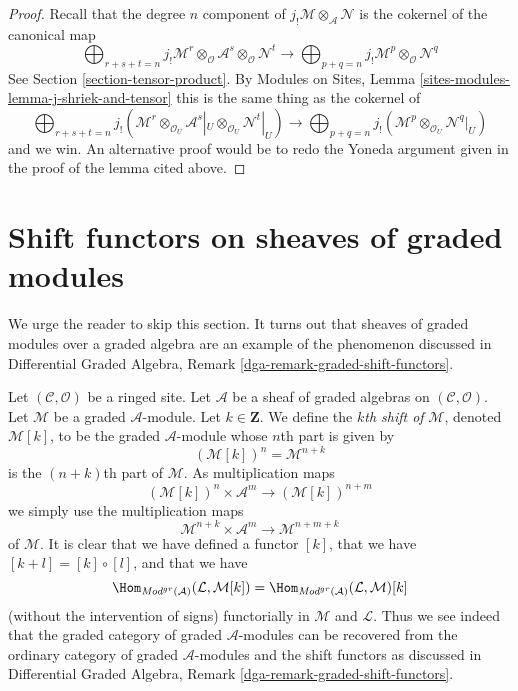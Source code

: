 \begin{proof}
Recall that the degree $n$ component of
$j_!\mathcal{M} \otimes_\mathcal{A} \mathcal{N}$ is the cokernel of
the canonical map
$$
\bigoplus\nolimits_{r + s + t = n}
j_!\mathcal{M}^r \otimes_\mathcal{O}
\mathcal{A}^s \otimes_\mathcal{O}
\mathcal{N}^t
\longrightarrow
\bigoplus\nolimits_{p + q = n}
j_!\mathcal{M}^p \otimes_\mathcal{O} \mathcal{N}^q
$$
See Section \ref{section-tensor-product}.
By Modules on Sites, Lemma \ref{sites-modules-lemma-j-shriek-and-tensor}
this is the same thing as the cokernel of
$$
\bigoplus\nolimits_{r + s + t = n}
j_!(\mathcal{M}^r \otimes_{\mathcal{O}_U}
\mathcal{A}^s|_U \otimes_{\mathcal{O}_U}
\mathcal{N}^t|_U)
\longrightarrow
\bigoplus\nolimits_{p + q = n}
j_!(\mathcal{M}^p \otimes_{\mathcal{O}_U} \mathcal{N}^q|_U)
$$
and we win. An alternative proof would be to redo the Yoneda
argument given in the proof of the lemma cited above.
\end{proof}








\section{Shift functors on sheaves of graded modules}
\label{section-shift}

\noindent
We urge the reader to skip this section. It turns out that sheaves
of graded modules over a graded algebra are an example of the phenomenon
discussed in
Differential Graded Algebra, Remark \ref{dga-remark-graded-shift-functors}.

\medskip\noindent
Let $(\mathcal{C}, \mathcal{O})$ be a ringed site.
Let $\mathcal{A}$ be a sheaf of graded algebras
on $(\mathcal{C}, \mathcal{O})$.
Let $\mathcal{M}$ be a graded $\mathcal{A}$-module. Let $k \in \mathbf{Z}$.
We define the {\it $k$th shift of} $\mathcal{M}$, denoted $\mathcal{M}[k]$,
to be the graded $\mathcal{A}$-module whose $n$th part is given by
$$
(\mathcal{M}[k])^n = \mathcal{M}^{n + k}
$$
is the $(n + k)$th part of $\mathcal{M}$. As multiplication maps
$$
(\mathcal{M}[k])^n \times \mathcal{A}^m
\longrightarrow
(\mathcal{M}[k])^{n + m}
$$
we simply use the multiplication maps
$$
\mathcal{M}^{n + k} \times \mathcal{A}^m
\longrightarrow
\mathcal{M}^{n + m + k}
$$
of $\mathcal{M}$. It is clear that we have defined a functor $[k]$,
that we have $[k + l] = [k] \circ [l]$, and that we have
$$
\Hom_{\textit{Mod}^{gr}(\mathcal{A})}(\mathcal{L}, \mathcal{M}[k]) =
\Hom_{\textit{Mod}^{gr}(\mathcal{A})}(\mathcal{L}, \mathcal{M})[k]
$$
(without the intervention of signs)
functorially in $\mathcal{M}$ and $\mathcal{L}$.
Thus we see indeed that the graded category of graded $\mathcal{A}$-modules
can be recovered from the ordinary category of graded $\mathcal{A}$-modules
and the shift functors as discussed in 
Differential Graded Algebra, Remark \ref{dga-remark-graded-shift-functors}.

